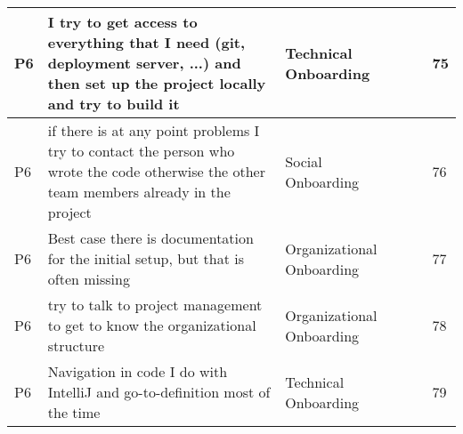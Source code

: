 \begin{appendices}
\begin{landscape}
\begin{longtable}{|p{0.8cm}|p{7cm}|p{3cm}|p{3cm}|p{5.5cm}|p{0.5cm}|}
      P6                   & I try to get access to everything that I need (git, deployment server, ...) and then set up the project locally and try to build it                                                                                                                                         & Technical Onboarding                     &                                    &                                                                                                                                                    & 75           \\ \hline
      P6                   & if there is at any point problems I try to contact the person who wrote the code otherwise the other team members already in the project                                                                                                                                    & Social Onboarding                        &                                    &                                                                                                                                                    & 76           \\ \hline
      P6                   & Best case there is documentation for the initial setup, but that is often missing                                                                                                                                                                                           & Organizational Onboarding                &                                    &                                                                                                                                                    & 77           \\ \hline
      P6                   & try to talk to project management to get to know the organizational structure                                                                                                                                                                                               & Organizational Onboarding                &                                    &                                                                                                                                                    & 78           \\ \hline
      P6                   & Navigation in code I do with IntelliJ and go-to-definition most of the time                                                                                                                                                                                                 & Technical Onboarding                     &                                    &                                                                                                                                                    & 79           \\ \hline

\end{longtable}
\end{landscape}
\end{appendices}
